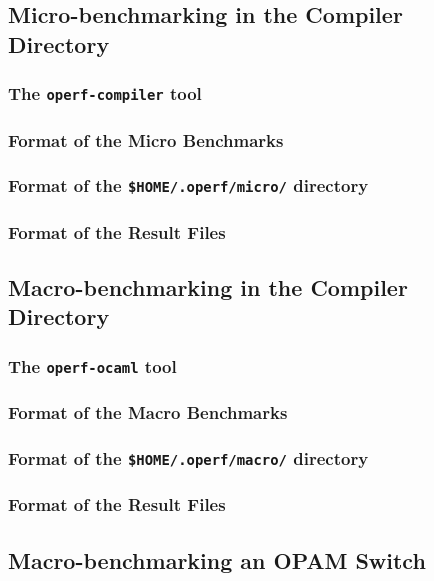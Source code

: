\documentclass[11pt,a4paper]{article}
\begin{document}
\subsection{Micro-benchmarking in the Compiler Directory}

\subsubsection{The {\tt operf-compiler} tool}

\subsubsection{Format of the Micro Benchmarks}

\subsubsection{Format of the {\tt \$HOME/.operf/micro/} directory}

\subsubsection{Format of the Result Files}



\subsection{Macro-benchmarking in the Compiler Directory}

\subsubsection{The {\tt operf-ocaml} tool}

\subsubsection{Format of the Macro Benchmarks}

\subsubsection{Format of the {\tt \$HOME/.operf/macro/} directory}

\subsubsection{Format of the Result Files}

\subsection{Macro-benchmarking an OPAM Switch}
\end{document}
